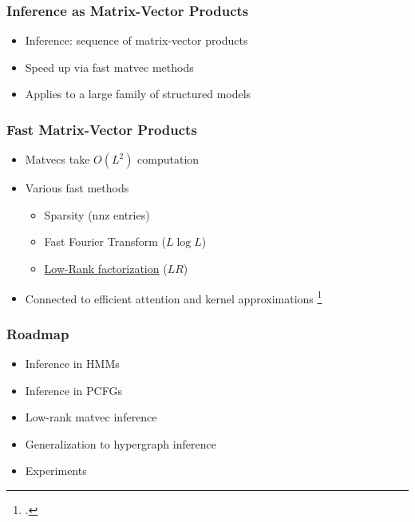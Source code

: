 \documentclass{beamer}
\begin{document}
\begin{frame}
\frametitle{Inference as Matrix-Vector Products}
\begin{itemize}
\item Inference: sequence of matrix-vector products
\vspace{1em}
\item Speed up via fast matvec methods 
\vspace{1em}
\item Applies to a large family of structured models
\end{itemize}
\end{frame}

\begin{frame}
\frametitle{Fast Matrix-Vector Products}
\begin{itemize}
\item Matvecs take $O(L^2)$ computation
\vspace{1em}
\item Various fast methods
    \begin{itemize}
    \item Sparsity (nnz entries)
    \item Fast Fourier Transform ($L \log L$)
    \item \underline{Low-Rank factorization} ($LR$)
    \end{itemize}
\vspace{1em}
\item Connected to efficient attention and kernel approximations
\footcite{performer,rfa,blanc2018adaptive}
\end{itemize}
\end{frame}

\begin{frame}
\frametitle{Roadmap}
\begin{itemize}
\item Inference in HMMs
\vspace{1em}
\item Inference in PCFGs
\vspace{1em}
\item Low-rank matvec inference
\vspace{1em}
\item Generalization to hypergraph inference
\vspace{1em}
\item Experiments
\end{itemize}
\end{frame}
\end{document}
